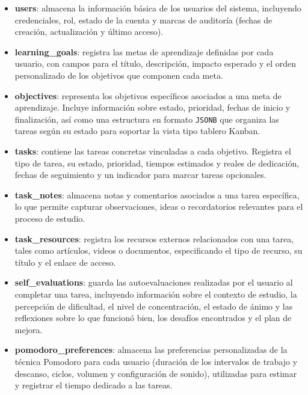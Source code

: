 \begin{itemize}
  \item \textbf{users}: almacena la información básica de los usuarios del sistema, incluyendo
  credenciales, rol, estado de la cuenta y marcas de auditoría (fechas de creación, actualización y
  último acceso).

  \item \textbf{learning\_goals}: registra las metas de aprendizaje definidas por cada usuario, con
  campos para el título, descripción, impacto esperado y el orden personalizado de los objetivos que
  componen cada meta.

  \item \textbf{objectives}: representa los objetivos específicos asociados a una meta de
  aprendizaje. Incluye información sobre estado, prioridad, fechas de inicio y finalización, así
  como una estructura en formato \texttt{JSONB} que organiza las tareas según su estado para
  soportar la vista tipo tablero Kanban.

  \item \textbf{tasks}: contiene las tareas concretas vinculadas a cada objetivo. Registra el tipo de
  tarea, su estado, prioridad, tiempos estimados y reales de dedicación, fechas de seguimiento y un
  indicador para marcar tareas opcionales.

  \item \textbf{task\_notes}: almacena notas y comentarios asociados a una tarea específica, lo que
  permite capturar observaciones, ideas o recordatorios relevantes para el proceso de estudio.

  \item \textbf{task\_resources}: registra los recursos externos relacionados con una tarea, tales
  como artículos, videos o documentos, especificando el tipo de recurso, su título y el enlace de
  acceso.

  \item \textbf{self\_evaluations}: guarda las autoevaluaciones realizadas por el usuario al
  completar una tarea, incluyendo información sobre el contexto de estudio, la percepción de
  dificultad, el nivel de concentración, el estado de ánimo y las reflexiones sobre lo que funcionó
  bien, los desafíos encontrados y el plan de mejora.

  \item \textbf{pomodoro\_preferences}: almacena las preferencias personalizadas de la técnica
  Pomodoro para cada usuario (duración de los intervalos de trabajo y descanso, ciclos, volumen y
  configuración de sonido), utilizadas para estimar y registrar el tiempo dedicado a las tareas.


\end{itemize}
